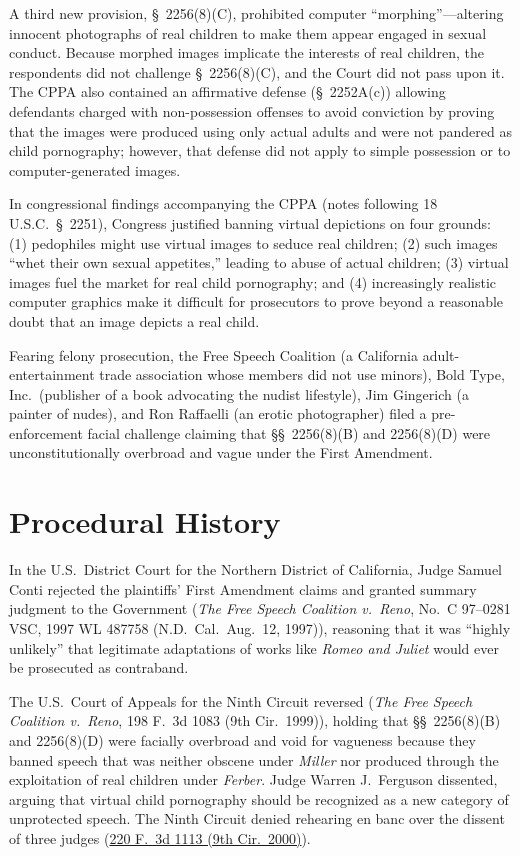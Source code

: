 \documentclass[12pt]{article}
\begin{document}
A third new provision, \S~2256(8)(C), prohibited computer ``morphing''---altering innocent photographs of real children to make them appear engaged in sexual conduct. Because morphed images implicate the interests of real children, the respondents did not challenge \S~2256(8)(C), and the Court did not pass upon it. The CPPA also contained an affirmative defense (\S~2252A(c)) allowing defendants charged with non-possession offenses to avoid conviction by proving that the images were produced using only actual adults and were not pandered as child pornography; however, that defense did not apply to simple possession or to computer-generated images.

In congressional findings accompanying the CPPA (notes following 18 U.S.C.\ \S~2251), Congress justified banning virtual depictions on four grounds: (1) pedophiles might use virtual images to seduce real children; (2) such images ``whet their own sexual appetites,'' leading to abuse of actual children; (3) virtual images fuel the market for real child pornography; and (4) increasingly realistic computer graphics make it difficult for prosecutors to prove beyond a reasonable doubt that an image depicts a real child.

Fearing felony prosecution, the Free Speech Coalition (a California adult-entertainment trade association whose members did not use minors), Bold Type, Inc.\ (publisher of a book advocating the nudist lifestyle), Jim Gingerich (a painter of nudes), and Ron Raffaelli (an erotic photographer) filed a pre-enforcement facial challenge claiming that \S\S~2256(8)(B) and 2256(8)(D) were unconstitutionally overbroad and vague under the First Amendment.

\section{Procedural History}

In the U.S.\ District Court for the Northern District of California, Judge Samuel Conti rejected the plaintiffs' First Amendment claims and granted summary judgment to the Government (\textit{The Free Speech Coalition v.\ Reno}, No.\ C 97--0281 VSC, 1997 WL 487758 (N.D.\ Cal.\ Aug.\ 12, 1997)), reasoning that it was ``highly unlikely'' that legitimate adaptations of works like \textit{Romeo and Juliet} would ever be prosecuted as contraband.

The U.S.\ Court of Appeals for the Ninth Circuit reversed (\textit{The Free Speech Coalition v.\ Reno}, 198 F.\ 3d 1083 (9th Cir.\ 1999)), holding that \S\S~2256(8)(B) and 2256(8)(D) were facially overbroad and void for vagueness because they banned speech that was neither obscene under \textit{Miller} nor produced through the exploitation of real children under \textit{Ferber}. Judge Warren J.\ Ferguson dissented, arguing that virtual child pornography should be recognized as a new category of unprotected speech. The Ninth Circuit denied rehearing en banc over the dissent of three judges (\href{https://law.justia.com/cases/federal/appellate-courts/F3/220/1113/625466/}{220 F.\ 3d 1113 (9th Cir.\ 2000)}).
\end{document}
